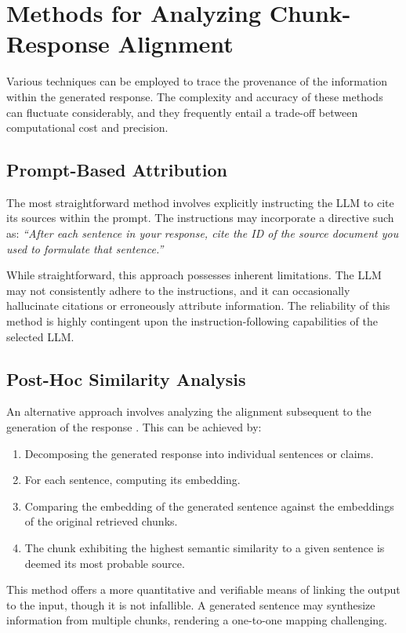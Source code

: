 \section{Methods for Analyzing Chunk-Response Alignment}
Various techniques can be employed to trace the provenance of the information within the generated response. The complexity and accuracy of these methods can fluctuate considerably, and they frequently entail a trade-off between computational cost and precision.

\subsection{Prompt-Based Attribution}
The most straightforward method involves explicitly instructing the LLM to cite its sources within the prompt. The instructions may incorporate a directive such as: \textit{\enquote{After each sentence in your response, cite the ID of the source document you used to formulate that sentence.}} \autocite{gao2024retrievalaugmentedgenerationlargelanguage}

While straightforward, this approach possesses inherent limitations. The LLM may not consistently adhere to the instructions, and it can occasionally hallucinate citations or erroneously attribute information. The reliability of this method is highly contingent upon the instruction-following capabilities of the selected LLM.

\subsection{Post-Hoc Similarity Analysis}
An alternative approach involves analyzing the alignment subsequent to the generation of the response \autocite{gao2024retrievalaugmentedgenerationlargelanguage}. This can be achieved by:
\begin{enumerate}
    \item Decomposing the generated response into individual sentences or claims.
    \item For each sentence, computing its embedding.
    \item Comparing the embedding of the generated sentence against the embeddings of the original retrieved chunks.
    \item The chunk exhibiting the highest semantic similarity to a given sentence is deemed its most probable source.
\end{enumerate}
This method offers a more quantitative and verifiable means of linking the output to the input, though it is not infallible. A generated sentence may synthesize information from multiple chunks, rendering a one-to-one mapping challenging.

